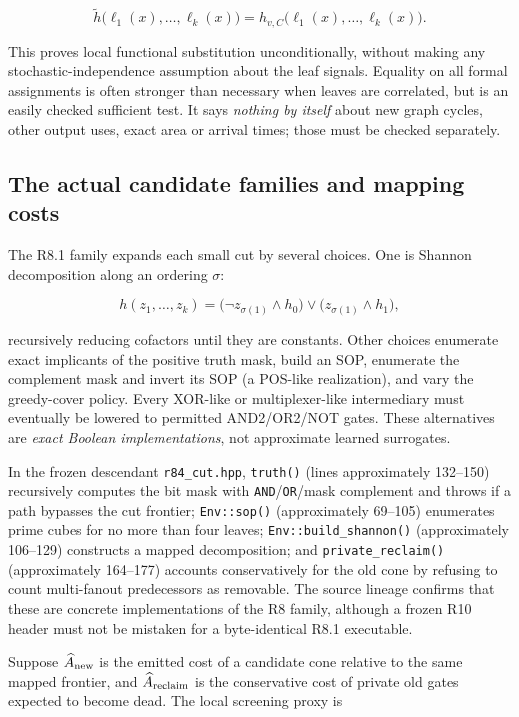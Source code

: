 \[
\tilde h\bigl(\ell_1(x),\ldots,\ell_k(x)\bigr)
=h_{v,C}\bigl(\ell_1(x),\ldots,\ell_k(x)\bigr).
\]

This proves local functional substitution unconditionally, without making any stochastic-independence assumption about the leaf signals. Equality on all formal assignments is often stronger than necessary when leaves are correlated, but is an easily checked sufficient test. It says \emph{nothing by itself} about new graph cycles, other output uses, exact area or arrival times; those must be checked separately.

\subsection{The actual candidate families and mapping costs}\label{the-actual-candidate-families-and-mapping-costs}

The R8.1 family expands each small cut by several choices. One is Shannon decomposition along an ordering \(\sigma\):

\[
h(z_1,\ldots,z_k)
=\bigl(\neg z_{\sigma(1)}\land h_0\bigr)
 \lor\bigl(z_{\sigma(1)}\land h_1\bigr),
\]

recursively reducing cofactors until they are constants. Other choices enumerate exact implicants of the positive truth mask, build an SOP, enumerate the complement mask and invert its SOP (a POS-like realization), and vary the greedy-cover policy. Every XOR-like or multiplexer-like intermediary must eventually be lowered to permitted AND2/OR2/NOT gates. These alternatives are \emph{exact Boolean implementations}, not approximate learned surrogates.

In the frozen descendant \texttt{r84\_cut.hpp}, \texttt{truth()} (lines approximately 132--150) recursively computes the bit mask with \texttt{AND}/\texttt{OR}/mask complement and throws if a path bypasses the cut frontier; \texttt{Env::sop()} (approximately 69--105) enumerates prime cubes for no more than four leaves; \texttt{Env::build\_shannon()} (approximately 106--129) constructs a mapped decomposition; and \texttt{private\_reclaim()} (approximately 164--177) accounts conservatively for the old cone by refusing to count multi-fanout predecessors as removable. The source lineage confirms that these are concrete implementations of the R8 family, although a frozen R10 header must not be mistaken for a byte-identical R8.1 executable.

Suppose \(\widehat A_{\rm new}\) is the emitted cost of a candidate cone relative to the same mapped frontier, and \(\widehat A_{\rm reclaim}\) is the conservative cost of private old gates expected to become dead. The local screening proxy is

